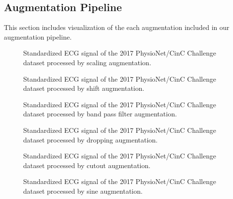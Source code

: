 \newpage

\subsection{Augmentation Pipeline}

This section includes visualization of the each augmentation included in our augmentation pipeline.

\begin{figure}[!ht]
    \setlength{\figH}{4cm}
    \setlength{\figW}{88.9mm}
    \centering
    
    \caption{Standardized ECG signal of the 2017 PhysioNet/CinC Challenge dataset \cite{Clifford2017} processed by scaling augmentation.}
    \label{fig:aug_scale}
\end{figure}

\begin{figure}[!ht]
    \setlength{\figH}{4cm}
    \setlength{\figW}{88.9mm}
    \centering
    
    \caption{Standardized ECG signal of the 2017 PhysioNet/CinC Challenge dataset \cite{Clifford2017} processed by shift augmentation.}
    \label{fig:aug_shift}
\end{figure}

\begin{figure}[!ht]
    \setlength{\figH}{4cm}
    \setlength{\figW}{88.9mm}
    \centering
    
    \caption{Standardized ECG signal of the 2017 PhysioNet/CinC Challenge dataset \cite{Clifford2017} processed by band pass filter augmentation.}
    \label{fig:aug_band_pass}
\end{figure}

\begin{figure}[!ht]
    \setlength{\figH}{4cm}
    \setlength{\figW}{88.9mm}
    \centering
    
    \caption{Standardized ECG signal of the 2017 PhysioNet/CinC Challenge dataset \cite{Clifford2017} processed by dropping augmentation.}
    \label{fig:aug_drop}
\end{figure}

\begin{figure}[!ht]
    \setlength{\figH}{4cm}
    \setlength{\figW}{88.9mm}
    \centering
    
    \caption{Standardized ECG signal of the 2017 PhysioNet/CinC Challenge dataset \cite{Clifford2017} processed by cutout augmentation.}
    \label{fig:aug_cutout}
\end{figure}

\begin{figure}[!ht]
    \setlength{\figH}{4cm}
    \setlength{\figW}{88.9mm}
    \centering
    
    \caption{Standardized ECG signal of the 2017 PhysioNet/CinC Challenge dataset \cite{Clifford2017} processed by sine augmentation.}
    \label{fig:aug_sine}
\end{figure}

